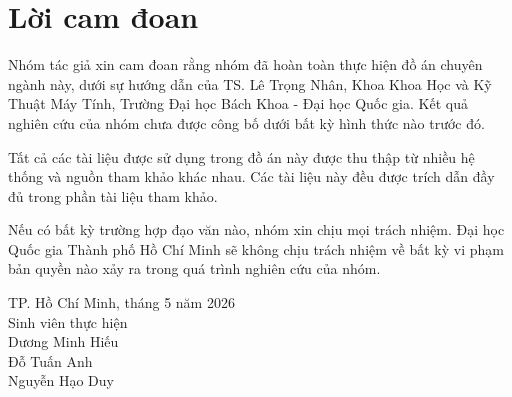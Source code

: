 
\section*{\centering Lời cam đoan}
Nhóm tác giả xin cam đoan rằng nhóm đã hoàn toàn thực hiện đồ án chuyên ngành này,
dưới sự hướng dẫn của TS. Lê Trọng Nhân, Khoa Khoa Học và Kỹ Thuật Máy Tính,
Trường Đại học Bách Khoa - Đại học Quốc gia. Kết quả nghiên cứu của nhóm chưa
được công bố dưới bất kỳ hình thức nào trước đó.

Tất cả các tài liệu được sử dụng trong đồ án này được thu thập từ nhiều hệ thống và
nguồn tham khảo khác nhau. Các tài liệu này đều được trích dẫn đầy đủ trong phần tài
liệu tham khảo.

Nếu có bất kỳ trường hợp đạo văn nào, nhóm xin chịu mọi trách nhiệm. Đại học Quốc
gia Thành phố Hồ Chí Minh sẽ không chịu trách nhiệm về bất kỳ vi phạm bản quyền
nào xảy ra trong quá trình nghiên cứu của nhóm.

\begin{flushright}
TP. Hồ Chí Minh, tháng 5 năm 2026 \\
Sinh viên thực hiện \\
Dương Minh Hiếu \\
Đỗ Tuấn Anh \\ 
Nguyễn Hạo Duy \\
\end{flushright}